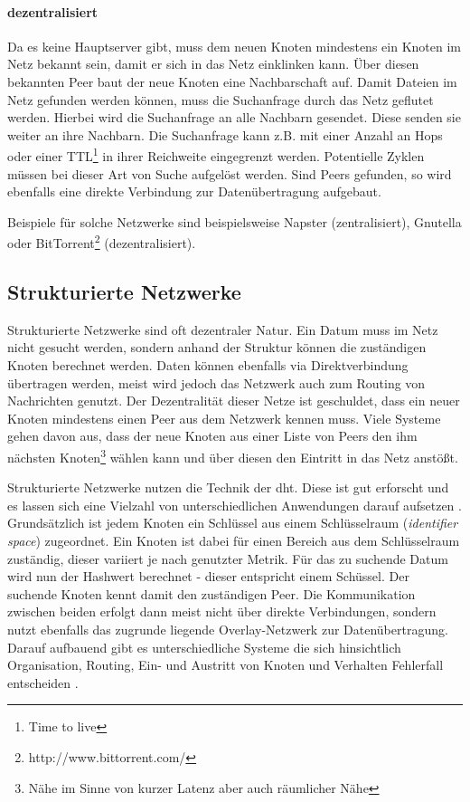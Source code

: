 \paragraph{dezentralisiert} Da es keine Hauptserver gibt, muss dem neuen Knoten mindestens ein Knoten im Netz bekannt sein, damit er sich in das Netz einklinken kann. Über diesen bekannten Peer baut der neue Knoten eine Nachbarschaft auf. Damit Dateien im Netz gefunden werden können, muss die Suchanfrage durch das Netz geflutet werden. Hierbei wird die Suchanfrage an alle Nachbarn gesendet. Diese senden sie weiter an ihre Nachbarn. Die Suchanfrage kann z.B. mit einer Anzahl an Hops oder einer TTL\footnote{Time to live} in ihrer Reichweite eingegrenzt werden. Potentielle Zyklen müssen bei dieser Art von Suche aufgelöst werden. Sind Peers gefunden, so wird ebenfalls eine direkte Verbindung zur Datenübertragung aufgebaut.

Beispiele für solche Netzwerke sind beispielsweise Napster (zentralisiert), Gnutella oder BitTorrent\footnote{http://www.bittorrent.com/} (dezentralisiert).

\subsection{Strukturierte Netzwerke}
Strukturierte Netzwerke sind oft dezentraler Natur. Ein Datum muss im Netz nicht gesucht werden,  sondern anhand der Struktur können die zuständigen Knoten berechnet werden. Daten können ebenfalls via Direktverbindung übertragen werden, meist wird jedoch das Netzwerk auch zum Routing von Nachrichten genutzt. Der Dezentralität dieser Netze ist geschuldet, dass ein neuer Knoten mindestens einen Peer aus dem Netzwerk kennen muss. Viele Systeme gehen davon aus, dass der neue Knoten aus einer Liste von Peers den ihm nächsten Knoten\footnote{Nähe im Sinne von kurzer Latenz aber auch räumlicher Nähe} wählen kann und über diesen den Eintritt in das Netz anstößt.

Strukturierte Netzwerke nutzen die Technik der \ac{dht}. Diese ist gut erforscht und es lassen sich eine Vielzahl von unterschiedlichen Anwendungen darauf aufsetzen \cite{Wehrle2005, Ghodsi2006AlgorithmsDHT}.\\
Grundsätzlich ist jedem Knoten ein Schlüssel aus einem Schlüsselraum (\emph{identifier space}) zugeordnet. Ein Knoten ist dabei für einen Bereich aus dem Schlüsselraum zuständig, dieser variiert je nach genutzter Metrik. Für das zu suchende Datum wird nun der Hashwert berechnet - dieser entspricht einem Schüssel. Der suchende Knoten kennt damit den zuständigen Peer. Die Kommunikation zwischen beiden erfolgt dann meist nicht über direkte Verbindungen, sondern nutzt ebenfalls das zugrunde liegende Overlay-Netzwerk zur Datenübertragung.\\
Darauf aufbauend gibt es unterschiedliche Systeme die sich hinsichtlich Organisation, Routing, Ein- und Austritt von Knoten und Verhalten Fehlerfall entscheiden \cite{Goetz2005, Lua2005Survey}.


